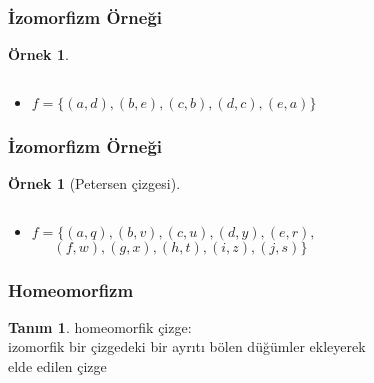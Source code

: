 \documentclass[dvipsnames]{beamer}
\theoremstyle{definition}
\newtheorem{tanim}[theorem]{Tanım}
\theoremstyle{example}
\newtheorem{ornek}[theorem]{Örnek}
\theoremstyle{plain}
\begin{document}
\begin{frame}
  \frametitle{İzomorfizm Örneği}

  \begin{ornek}
    \begin{columns}
      \begin{center}
      \end{center}

      \begin{center}
      \end{center}
    \end{columns}

    \pause
    \bigskip
    \begin{itemize}
      \item $f = \{(a,d),(b,e),(c,b),(d,c),(e,a)\}$
    \end{itemize}
  \end{ornek}
\end{frame}

\begin{frame}
  \frametitle{İzomorfizm Örneği}

  \begin{ornek}[Petersen çizgesi]
    \begin{columns}
      \begin{center}
      \end{center}

      \begin{center}
      \end{center}
    \end{columns}

    \pause
    \bigskip
    \begin{itemize}
      \item $f = \{(a,q),(b,v),(c,u),(d,y),(e,r),$\\
        $~~~~~~~(f,w),(g,x),(h,t),(i,z),(j,s)\}$
    \end{itemize}
  \end{ornek}
\end{frame}

\begin{frame}
  \frametitle{Homeomorfizm}

  \begin{tanim}
    \alert{homeomorfik çizge}:\\
    izomorfik bir çizgedeki bir ayrıtı bölen düğümler ekleyerek\\
    elde edilen çizge
  \end{tanim}
\end{frame}
\end{document}
